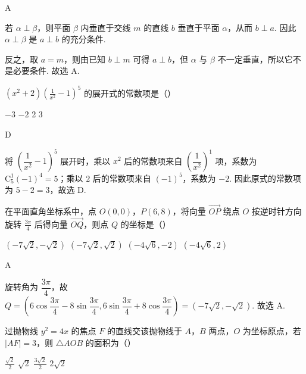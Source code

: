 \begin{answer}
A
\end{answer}

\begin{solution}
若 \(\alpha\perp\beta\)，则平面 \(\beta\) 内垂直于交线 \(m\) 的直线 \(b\) 垂直于平面 \(\alpha\)，从而 \(b\perp a\). 因此 \(\alpha\perp\beta\) 是 \(a\perp b\) 的充分条件.

反之，取 \(a=m\)，则由已知 \(b\perp m\) 可得 \(a\perp b\)，但 \(\alpha\) 与 \(\beta\) 不一定垂直，所以它不是必要条件. 故选 A.
\end{solution}

\begin{problem}
\((x^{2} + 2)\left(\frac{1}{x^{2}} -1\right)^{5}\) 的展开式的常数项是（\quad）

\choices
    {\(-3\)}
    {\(-2\)}
    {2}
    {3}
\end{problem}

\begin{answer}
D
\end{answer}

\begin{solution}
将 \(\left(\dfrac{1}{x^2}-1\right)^5\) 展开时，乘以 \(x^2\) 后的常数项来自 \(\left(\dfrac{1}{x^2}\right)^1\) 项，系数为 \(\mathrm C_5^1(-1)^4=5\)；乘以 \(2\) 后的常数项来自 \((-1)^5\)，系数为 \(-2\). 因此原式的常数项为 \(5-2=3\)，故选 D.
\end{solution}

\begin{problem}
在平面直角坐标系中，点 \(O(0,0)\)，\(P(6,8)\)，将向量 \(\overrightarrow{OP}\) 绕点 \(O\) 按逆时针方向旋转 \(\frac{3\pi}{4}\) 后得向量 \(\overrightarrow{OQ}\)，则点 \(Q\) 的坐标是（\quad）

\choices
    {\((-7\sqrt{2}, - \sqrt{2})\)}
    {\((-7\sqrt{2}, \sqrt{2})\)}
    {\((-4\sqrt{6}, - 2)\)}
    {\((-4\sqrt{6}, 2)\)}
\end{problem}

\begin{answer}
A
\end{answer}

\begin{solution}
旋转角为 \(\dfrac{3\pi}{4}\)，故
\(Q=\left(6\cos\dfrac{3\pi}{4}-8\sin\dfrac{3\pi}{4},6\sin\dfrac{3\pi}{4}+8\cos\dfrac{3\pi}{4}\right)=(-7\sqrt{2},-\sqrt{2})\). 故选 A.
\end{solution}

\begin{problem}
过抛物线 \( y^{2} = 4x \) 的焦点 \(F\) 的直线交该抛物线于 \(A\)，\(B\) 两点，\(O\) 为坐标原点，若 \( |AF| = 3 \)，则 \( \triangle AOB \) 的面积为（\quad）

\choices
    {\(\frac{\sqrt{2}}{2}\)}
    {\(\sqrt{2}\)}
    {\(\frac{3\sqrt{2}}{2}\)}
    {\(2 \sqrt{2}\)}
\end{problem}


